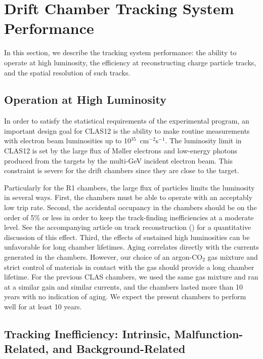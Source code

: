 \section{Drift Chamber Tracking System Performance}

In this section, we describe the tracking system performance: the ability to operate at high luminosity,
the efficiency at reconstructing charge particle tracks, and the spatial resolution of such tracks.

\subsection{Operation at High Luminosity}

In order to satisfy the statistical requirements of the experimental program, an important design
goal for CLAS12 is the ability to make routine measurements with electron beam luminosities up to
10$^{35}$~cm$^{-2}$s$^{-1}$.  The luminosity limit in CLAS12 is 
set by the large flux of M{\o}ller electrons and low-energy photons 
produced from the targets by the multi-GeV incident electron beam.  This 
constraint is severe for the drift chambers since they are close to the 
target. 

Particularly for the R1 chambers, the large flux of particles limits the luminosity in several ways.
First, the chambers must be able to operate with an acceptably low trip rate.
Second, the accidental occupancy in the chambers should be on the order
of 5\% or less in order to keep the track-finding inefficiencies at a moderate 
level.  See the accompanying article on track reconstruction (\cite{recon-nim})
for a quantitative discussion of this effect.  Third, the effects of sustained high 
luminosities can be unfavorable for long chamber lifetimes.  Aging correlates 
directly with the currents generated in the chambers.
However, our choice of an argon-CO$_2$ gas mixture and strict control of
materials in contact with the gas should provide a long chamber lifetime.
For the previous CLAS chambers, we used the same gas mixture and ran at a
similar gain and similar currents, and the chambers lasted more than 10 years 
with no indication of aging.  We expect the present
chambers to perform well for at least 10 years.

\subsection{Tracking Inefficiency: Intrinsic, Malfunction-Related, and Background-Related}

